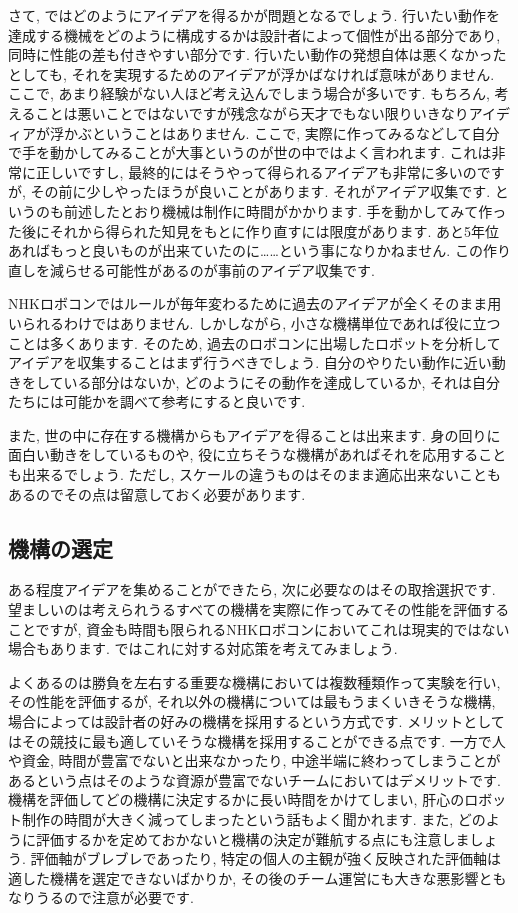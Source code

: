 さて, ではどのようにアイデアを得るかが問題となるでしょう. 行いたい動作を達成する機械をどのように構成するかは設計者によって個性が出る部分であり, 同時に性能の差も付きやすい部分です. 行いたい動作の発想自体は悪くなかったとしても, それを実現するためのアイデアが浮かばなければ意味がありません. 
ここで, あまり経験がない人ほど考え込んでしまう場合が多いです. もちろん, 考えることは悪いことではないですが残念ながら天才でもない限りいきなりアイディアが浮かぶということはありません. 
ここで, 実際に作ってみるなどして自分で手を動かしてみることが大事というのが世の中ではよく言われます. これは非常に正しいですし, 最終的にはそうやって得られるアイデアも非常に多いのですが, その前に少しやったほうが良いことがあります. それがアイデア収集です. というのも前述したとおり機械は制作に時間がかかります. 手を動かしてみて作った後にそれから得られた知見をもとに作り直すには限度があります. あと5年位あればもっと良いものが出来ていたのに……という事になりかねません. この作り直しを減らせる可能性があるのが事前のアイデア収集です.

NHKロボコンではルールが毎年変わるために過去のアイデアが全くそのまま用いられるわけではありません. しかしながら, 小さな機構単位であれば役に立つことは多くあります. そのため, 過去のロボコンに出場したロボットを分析してアイデアを収集することはまず行うべきでしょう. 自分のやりたい動作に近い動きをしている部分はないか, どのようにその動作を達成しているか, それは自分たちには可能かを調べて参考にすると良いです. 

また, 世の中に存在する機構からもアイデアを得ることは出来ます. 身の回りに面白い動きをしているものや, 役に立ちそうな機構があればそれを応用することも出来るでしょう. ただし, スケールの違うものはそのまま適応出来ないこともあるのでその点は留意しておく必要があります. 

\subsection{機構の選定}
ある程度アイデアを集めることができたら, 次に必要なのはその取捨選択です. 望ましいのは考えられうるすべての機構を実際に作ってみてその性能を評価することですが, 資金も時間も限られるNHKロボコンにおいてこれは現実的ではない場合もあります. ではこれに対する対応策を考えてみましょう.

よくあるのは勝負を左右する重要な機構においては複数種類作って実験を行い, その性能を評価するが, それ以外の機構については最もうまくいきそうな機構, 場合によっては設計者の好みの機構を採用するという方式です. 
メリットとしてはその競技に最も適していそうな機構を採用することができる点です. 
一方で人や資金, 時間が豊富でないと出来なかったり, 中途半端に終わってしまうことがあるという点はそのような資源が豊富でないチームにおいてはデメリットです. 機構を評価してどの機構に決定するかに長い時間をかけてしまい, 肝心のロボット制作の時間が大きく減ってしまったという話もよく聞かれます. 
また, どのように評価するかを定めておかないと機構の決定が難航する点にも注意しましょう. 評価軸がブレブレであったり, 特定の個人の主観が強く反映された評価軸は適した機構を選定できないばかりか, その後のチーム運営にも大きな悪影響ともなりうるので注意が必要です. 

